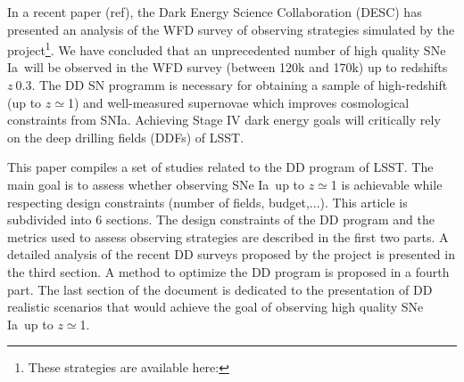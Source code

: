 \documentclass[\docopts]{\docclass}
\newcommand{\sne}{{SNe Ia}}
\begin{document}
\par
In a recent paper (ref), the Dark Energy Science Collaboration (DESC) has presented an analysis of the WFD survey of observing strategies simulated by the project\footnote{These strategies are available here: }. We have concluded that an unprecedented number of high quality \sne~will be observed in the WFD survey (between 120k and 170k) up to redshifts $z~$0.3. The DD SN programm is necessary for obtaining a sample of high-redshift (up to $z\simeq$1) and well-measured supernovae which improves cosmological constraints from SNIa. Achieving Stage IV dark energy goals will critically rely on the deep drilling fields (DDFs) of LSST.
\par
This paper compiles a set of studies related to the DD program of LSST. The main goal is to assess whether observing \sne~up to $z\simeq$1 is achievable while respecting design constraints (number of fields, budget,...). This article is subdivided into 6 sections. The design constraints of the DD program and the metrics used to assess observing strategies are described in the first two parts. A detailed analysis of the recent DD surveys proposed by the project is presented in the third section. A method to optimize the DD program is proposed in a fourth part. The last section of the document is dedicated to the presentation of DD realistic scenarios that would achieve the goal of observing high quality \sne~up to   $z\simeq$1.
\end{document}
